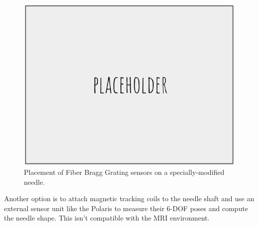 \begin{figure}[h]
\includegraphics[width=1.0\textwidth]{Fig/placeholder.png}
\caption{Placement of Fiber Bragg Grating sensors on a specially-modified needle\cite{roesthuis_three-dimensional_2014}.}
\label{fig:needle_fbg}
\end{figure}

Another option is to attach magnetic tracking coils to the needle shaft and use an external sensor unit like the Polaris to measure their 6-DOF poses and compute the needle shape.
\cite{patil_needle_2014,wang_real-time_2015} This isn’t compatible with the MRI environment.







